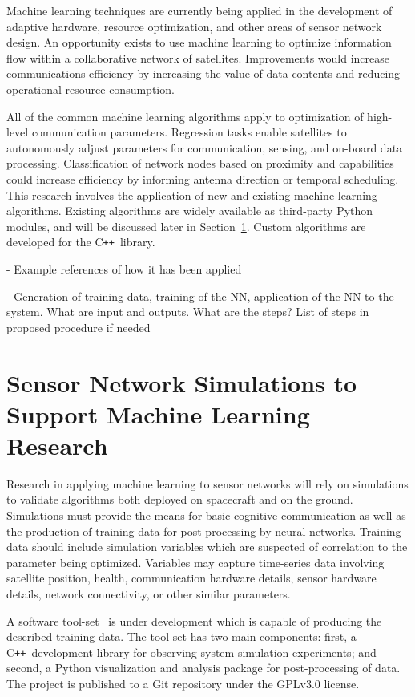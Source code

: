 \documentclass[conference]{IEEEtran}
\newcommand{\project}{{\sc{Collaborate}}~}
\newcommand{\cpp}{C\texttt{++}~}
\begin{document}
Machine learning techniques are currently being applied in the development of adaptive hardware, resource optimization, and other areas of sensor network design.  An opportunity exists to use machine learning to optimize information flow within a collaborative network of satellites.  Improvements would increase communications efficiency by increasing the value of data contents and reducing operational resource consumption.

All of the common machine learning algorithms apply to optimization of high-level communication parameters.  Regression tasks enable satellites to autonomously adjust parameters for communication, sensing, and on-board data processing.  Classification of network nodes based on proximity and capabilities could increase efficiency by informing antenna direction or temporal scheduling.  This research involves the application of new and existing machine learning algorithms.  Existing algorithms are widely available as third-party Python modules, and will be discussed later in Section~\ref{sec:software}.  Custom algorithms are developed for the \cpp library.

{
  \color{red}
  - Example references of how it has been applied

  - Generation of training data, training of the NN, application of the NN to the system. What are input and outputs. What are the steps? List of steps in proposed procedure if needed
}


\section{Sensor Network Simulations to Support Machine Learning Research}
\label{sec:software}

Research in applying machine learning to sensor networks will rely on simulations to validate algorithms both deployed on spacecraft and on the ground.  Simulations must provide the means for basic cognitive communication as well as the production of training data for post-processing by neural networks.  Training data should include simulation variables which are suspected of correlation to the parameter being optimized.  Variables may capture time-series data involving satellite position, health, communication hardware details, sensor hardware details, network connectivity, or other similar parameters.

A software tool-set \project is under development which is capable of producing the described training data.  The tool-set has two main components: first, a \cpp development library for observing system simulation experiments; and second, a Python visualization and analysis package for post-processing of data.  The project is published to a Git repository under the GPLv3.0 license.
\end{document}
